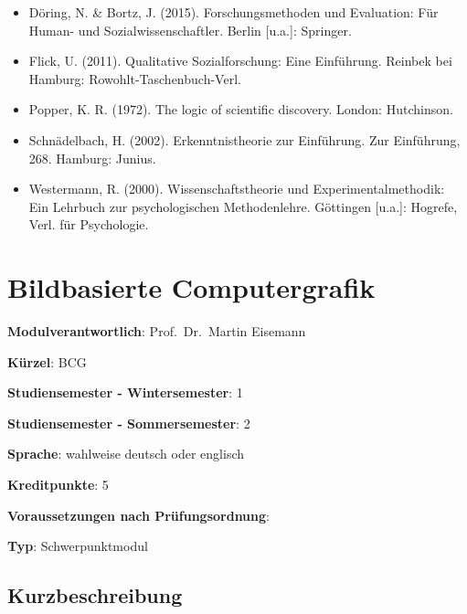 \begin{itemize}
\tightlist
\item
  Döring, N. \& Bortz, J. (2015). Forschungsmethoden und Evaluation: Für
  Human- und Sozialwissenschaftler. Berlin {[}u.a.{]}: Springer.
\item
  Flick, U. (2011). Qualitative Sozialforschung: Eine Einführung.
  Reinbek bei Hamburg: Rowohlt-Taschenbuch-Verl.
\item
  Popper, K. R. (1972). The logic of scientific discovery. London:
  Hutchinson.
\item
  Schnädelbach, H. (2002). Erkenntnistheorie zur Einführung. Zur
  Einführung, 268. Hamburg: Junius.
\item
  Westermann, R. (2000). Wissenschaftstheorie und Experimentalmethodik:
  Ein Lehrbuch zur psychologischen Methodenlehre. Göttingen {[}u.a.{]}:
  Hogrefe, Verl. für Psychologie.
\end{itemize}

\chapter{Bildbasierte Computergrafik}\label{bildbasierte-computergrafik}

\begin{modulHead}
\textbf{Modulverantwortlich}: Prof.~Dr.~Martin
Eisemann
\end{modulHead}
\begin{modulHead}
\textbf{Kürzel}:
BCG
\end{modulHead}
\begin{modulHead}
\textbf{Studiensemester -
Wintersemester}:
1
\end{modulHead}
\begin{modulHead}
\textbf{Studiensemester -
Sommersemester}: 2
\end{modulHead}
\begin{modulHead}
\textbf{Sprache}:
wahlweise deutsch oder
englisch
\end{modulHead}
\begin{modulHead}
\textbf{Kreditpunkte}:
5
\end{modulHead}
\begin{modulHead}
\textbf{Voraussetzungen nach
Prüfungsordnung}: ~
\end{modulHead}
\begin{modulHead}
\textbf{Typ}:
Schwerpunktmodul
\end{modulHead}


\section*{Kurzbeschreibung}\label{kurzbeschreibung-11}

